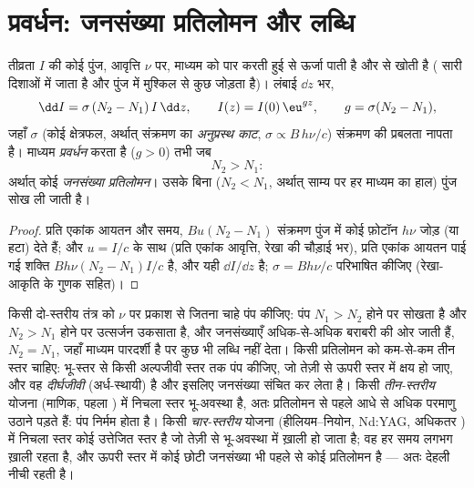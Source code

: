 \section{प्रवर्धन: जनसंख्या प्रतिलोमन और लब्धि}

\begin{proposition}[किसी माध्यम की लब्धि]\label{prop:b2:laser:gain}
तीव्रता $I$ की कोई पुंज, आवृत्ति $\nu$ पर, माध्यम को पार करती हुई
 से ऊर्जा पाती है और  से खोती है
( सारी दिशाओं में जाता है और पुंज में मुश्किल से कुछ
जोड़ता है)। लंबाई $\dd z$ भर,
\[
\dd I = \sigma\,(N_2 - N_1)\,I\,\dd z, \qquad
I(z) = I(0)\,\eu^{g z}, \qquad g = \sigma(N_2 - N_1),
\]
जहाँ $\sigma$ (कोई क्षेत्रफल, अर्थात् संक्रमण का \emph{अनुप्रस्थ काट}, $\sigma \propto B\,h\nu/c$) संक्रमण की
प्रबलता नापता है। माध्यम \emph{प्रवर्धन} करता है ($g > 0$)
तभी जब
\[
N_2 > N_1 :
\]
अर्थात् कोई \emph{जनसंख्या प्रतिलोमन}। उसके बिना
($N_2 < N_1$, अर्थात् साम्य पर हर माध्यम का हाल) पुंज
सोख ली जाती है।
\end{proposition}

\begin{proof}
प्रति एकांक आयतन और समय, $B u (N_2 - N_1)$ संक्रमण पुंज में कोई फ़ोटॉन $h\nu$
जोड़ (या हटा) देते हैं; और $u = I/c$ के साथ (प्रति एकांक आवृत्ति, रेखा की
चौड़ाई भर), प्रति एकांक आयतन पाई गई शक्ति
$B h\nu (N_2 - N_1) I/c$ है, और यही $\dd I/\dd z$ है; $\sigma =
Bh\nu/c$ परिभाषित कीजिए (रेखा-आकृति के गुणक सहित)।
\end{proof}

\begin{remark}[दो स्तर प्रतिलोमित क्यों नहीं हो सकते]\label{rem:b2:laser:twolevel}
किसी दो-स्तरीय तंत्र को $\nu$ पर प्रकाश से जितना चाहे पंप कीजिए:
पंप $N_1 > N_2$ होने पर सोखता है और $N_2 > N_1$ होने पर उत्सर्जन उकसाता है,
और जनसंख्याएँ अधिक-से-अधिक बराबरी की ओर जाती हैं, $N_2 = N_1$, जहाँ
माध्यम पारदर्शी है पर कुछ भी लब्धि नहीं देता। किसी प्रतिलोमन को कम-से-कम
तीन स्तर चाहिए: भू-स्तर से किसी अल्पजीवी स्तर तक पंप कीजिए, जो
तेज़ी से ऊपरी  स्तर में क्षय हो जाए, और वह \emph{दीर्घजीवी}
(अर्ध-स्थायी) है और इसलिए जनसंख्या संचित कर लेता है। किसी
\emph{तीन-स्तरीय} योजना (माणिक, पहला
) में निचला  स्तर भू-अवस्था है, अतः प्रतिलोमन से पहले आधे से अधिक
परमाणु उठाने पड़ते हैं: पंप निर्मम होता है। किसी
\emph{चार-स्तरीय} योजना (हीलियम--नियोन, Nd:YAG, अधिकतर
) में निचला  स्तर कोई उत्तेजित स्तर है जो तेज़ी से
भू-अवस्था में ख़ाली हो जाता है; वह हर समय लगभग ख़ाली रहता है, और ऊपरी स्तर में कोई छोटी
जनसंख्या भी पहले से कोई प्रतिलोमन है --- अतः देहली
नीची रहती है।
\end{remark}

